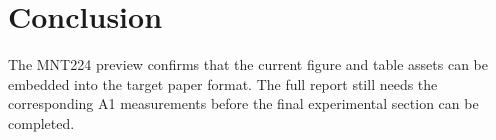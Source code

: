 \section{Conclusion}
The MNT224 preview confirms that the current figure and table assets can be embedded into the target paper format. The full report still needs the corresponding A1 measurements before the final experimental section can be completed.
